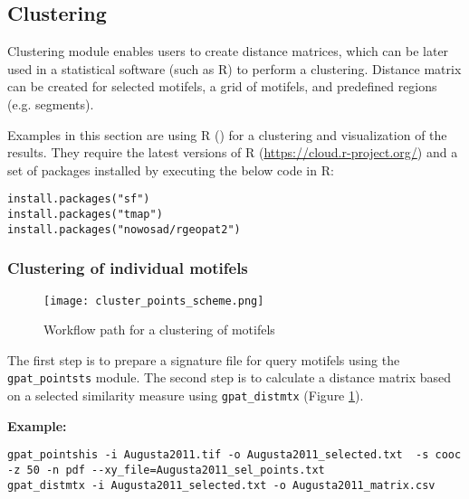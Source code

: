 \FloatBarrier

\subsection{Clustering \label{clustering}}

Clustering module enables users to create distance matrices, which can be later used in a statistical software (such as R) to perform a clustering.
Distance matrix can be created for selected motifels, a grid of motifels, and predefined regions (e.g. segments).

Examples in this section are using R (\cite{R}) for a clustering and visualization of the results. 
They require the latest versions of R (\url{https://cloud.r-project.org/}) and a set of packages installed by executing the below code in R:

\begin{minipage}{\linewidth}
\begin{lstlisting}
install.packages("sf")
install.packages("tmap")
install.packages("nowosad/rgeopat2")
\end{lstlisting}
\end{minipage}

\subsubsection{Clustering of individual motifels}

\begin{figure}[H]
	\centering
	\texttt{[image: cluster\_points\_scheme.png]}
	\caption{Workflow path for a clustering of motifels}
	\label{FIG:CLUSTER_POINTS}
\end{figure}

The first step is to prepare a signature file for query motifels using the {\tt gpat\_pointsts} module. 
The second step is to calculate a distance matrix based on a selected similarity measure using {\tt gpat\_distmtx} (Figure \ref{FIG:CLUSTER_POINTS}).

{\bf Example:}

\begin{minipage}{\linewidth}
\begin{lstlisting}
gpat_pointshis -i Augusta2011.tif -o Augusta2011_selected.txt  -s cooc -z 50 -n pdf --xy_file=Augusta2011_sel_points.txt
gpat_distmtx -i Augusta2011_selected.txt -o Augusta2011_matrix.csv
\end{lstlisting}
\end{minipage}

